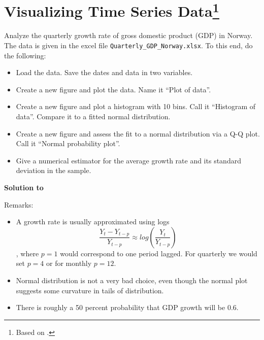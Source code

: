 \documentclass[a4paper]{scrartcl}
\begin{document}
\section[Visualizing Time Series Data]{Visualizing Time Series Data\footnote{Based on \citet[Ch.~1]{BjornlandThorsrud.2015}.}}\label{ex:VisualizingTSData}
Analyze the quarterly growth rate of gross domestic product (GDP) in Norway. The data is given in the excel file \texttt{Quarterly\_GDP\_Norway.xlsx}. To this end, do the following:
\begin{itemize}
	\item Load the data. Save the dates and data in two variables. 
	\item Create a new figure and plot the data. Name it \enquote{Plot of data}.
	\item Create a new figure and plot a histogram with 10 bins. Call it \enquote{Histogram of data}. Compare it to a fitted normal distribution.
	\item Create a new figure and assess the fit to a normal distribution via a Q-Q plot. Call it \enquote{Normal probability plot}.
	\item Give a numerical estimator for the average growth rate and its standard deviation in the sample.
\end{itemize}
\begin{solution}\textbf{Solution to }

Remarks:
\begin{itemize}
\item A growth rate is usually approximated using logs $$\frac{Y_t - Y_{t-p}}{Y_{t-p}} \approx log \left(\frac{Y_t}{Y_{t-p}}\right)$$, where $p=1$ would correspond to one period lagged. For quarterly we would set $p=4$ or for monthly $p=12$.
\item Normal distribution is not a very bad choice, even though the normal plot suggests some curvature in tails of distribution.
\item There is roughly a 50 percent probability that GDP growth will be 0.6.
\end{itemize}
\newpage
\end{solution}

\newpage
\end{document}
